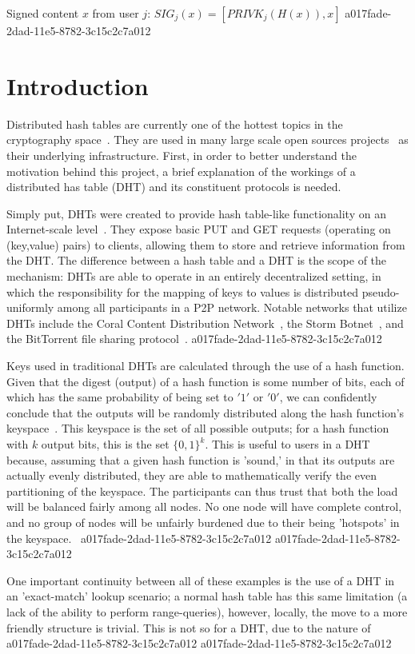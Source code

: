 \documentclass[12pt]{article}
\begin{document}
Signed content $x$ from user $j$: $SIG_j(x) = \left[ PRIVK_j( H(x) ), x \right]$
a017fade-2dad-11e5-8782-3c15c2c7a012
\section{Introduction}
\par Distributed hash tables are currently one of the hottest topics in the cryptography space~\cite{Stoica:2001dj,Rowstron:2001ea,Ratnasamy:2001wn}. They are used in many large scale open sources projects~\cite{Freitas:2013tb,Xu:2010vs,Perfitt:2010fh} as their underlying infrastructure. First, in order to better understand the motivation behind this project, a brief explanation of the workings of a distributed has table (DHT) and its constituent protocols is needed.

\par Simply put, DHTs were created to provide hash table-like functionality on an Internet-scale level~\cite{Ratnasamy:2001wn}. They expose basic PUT and GET requests (operating on (key,value) pairs) to clients, allowing them to store and retrieve information from the DHT. The difference between a hash table and a DHT is the scope of the mechanism: DHTs are able to operate in an entirely decentralized setting, in which the responsibility for the mapping of keys to values is distributed pseudo-uniformly among all participants in a P2P network. Notable networks that utilize DHTs include the Coral Content Distribution Network~\cite{Freedman:2004vb}, the Storm Botnet~\cite{Holz:2008uk}, and the BitTorrent file sharing protocol~\cite{Cohen:y1_8mBnw}.
a017fade-2dad-11e5-8782-3c15c2c7a012
\par Keys used in traditional DHTs are calculated through the use of a hash function. Given that the digest (output) of a hash function is some number of bits, each of which has the same probability of being set to $'1'$ or $'0'$, we can confidently conclude that the outputs will be randomly distributed along the hash function's keyspace~. This keyspace is the set of all possible outputs; for a hash function with $k$ output bits, this is the set $\{0,1\}^k$. This is useful to users in a DHT because, assuming that a given hash function is 'sound,' in that its outputs are actually evenly distributed, they are able to mathematically verify the even partitioning of the keyspace. The participants can thus trust that both the load will be balanced fairly among all nodes. No one node will have complete control, and no group of nodes will be unfairly burdened due to their being 'hotspots' in the keyspace.~
a017fade-2dad-11e5-8782-3c15c2c7a012
a017fade-2dad-11e5-8782-3c15c2c7a012\par One important continuity between all of these examples is the use of a DHT in an 'exact-match' lookup scenario; a normal hash table has this same limitation (a lack of the ability to perform range-queries), however, locally, the move to a more friendly structure is trivial. This is not so for a DHT, due to the nature of
a017fade-2dad-11e5-8782-3c15c2c7a012\printbibliography
a017fade-2dad-11e5-8782-3c15c2c7a012
\end{document}
